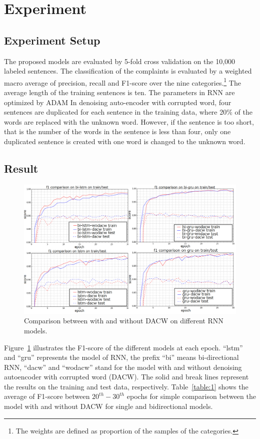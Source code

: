 \setlength{\parindent}{0.5cm}
\section{Experiment}
\subsection{Experiment Setup}
The proposed models are evaluated by 5-fold cross validation on the 10,000 labeled sentences.
The classification of the complaints is evaluated by a weighted macro average of precision,
recall and F1-score over the nine categories.\footnote{The weights are defined as proportion of the samples of the categories.}
The average length of the training sentences is ten.
The parameters in RNN are optimized by ADAM \cite{DBLP:journals/corr/KingmaB14}
In denoising auto-encoder with corrupted word,
four sentences are duplicated for each sentence in the training data,
where 20\% of the words are replaced with the unknown word.
However, if the sentence is too short, that is the number of the words
in the sentence is less than four, only one duplicated sentence
is created with one word is changed to the unknown word.

\subsection{Result}
\begin{figure}[!h]
\centering
  \includegraphics[scale=0.3]{image/5.png}
  \caption{Comparison between with and without DACW on different RNN models.}
  \label{fig:5}
\end{figure}
Figure~\ref{fig:5} illustrates the F1-score of the different models at each epoch.
``lstm'' and ``gru'' represents the model of RNN,
the prefix ``bi'' means bi-directional RNN, ``dacw'' and ``wodacw''
stand for the model with and without denoising autoencoder
with corrupted word (DACW).
The solid and break lines represent the results on the training
and test data, respectively.
Table~\ref{table:1} shows the average of F1-score between
$20^{th}-30^{th}$ epochs for simple comparison between
the model with and without DACW for single and bidirectional models.




